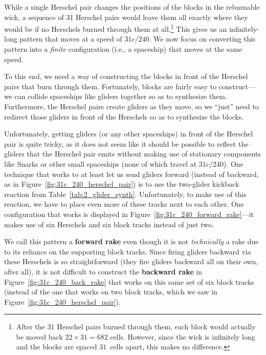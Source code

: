 While a single Herschel pair changes the positions of the blocks in the reburnable wick, a sequence of 31 Herschel pairs would leave them all exactly where they would be if no Herschels burned through them at all.\footnote{After the $31$ Herschel pairs burned through them, each block would actually be moved back $22 \times 31 = 682$ cells. However, since the wick is infinitely long and the blocks are spaced $31$~cells apart, this makes no difference.} This gives us an infinitely-long pattern that moves at a speed of $31c/240$. We now focus on converting this pattern into a \emph{finite} configuration (i.e., a spaceship) that moves at the same speed.

To this end, we need a way of constructing the blocks in front of the Herschel pairs that burn through them. Fortunately, blocks are fairly easy to construct---we can collide spaceships like gliders together so as to synthesize them. Furthermore, the Herschel pairs create gliders as they move, so we ``just'' need to redirect those gliders in front of the Herschels so as to synthesize the blocks.

Unfortunately, getting gliders (or any other spaceships) in front of the Herschel pair is quite tricky, as it does not seem like it should be possible to reflect the gliders that the Herschel pair emits without making use of stationary components like Snarks or other small spaceships (none of which travel at $31c/240$). One technique that works to at least let us send gliders forward (instead of backward, as in Figure~\ref{fig:31c_240_herschel_pair}) is to use the two-glider kickback reaction from Table~\ref{tab:2_glider_synth}. Unfortunately, to make use of this reaction, we have to place even more of these tracks next to each other. One configuration that works is displayed in Figure~\ref{fig:31c_240_forward_rake}---it makes use of six Herschels and six block tracks instead of just two.

We call this pattern a \textbf{forward rake} even though it is not \emph{technically} a rake due to its reliance on the supporting block tracks. Since firing gliders backward via these Herschels is so straightforward (they fire gliders backward all on their own, after all), it is not difficult to construct the \textbf{backward rake} in Figure~\ref{fig:31c_240_back_rake} that works on this same set of six block tracks (instead of the one that works on two block tracks, which we saw in Figure~\ref{fig:31c_240_herschel_pair}).

